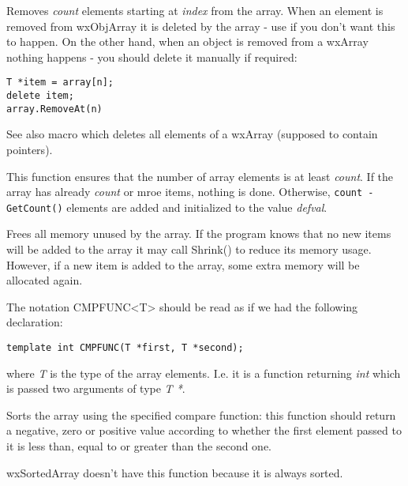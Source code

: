 
Removes {\it count} elements starting at {\it index} from the array. When an
element is removed from wxObjArray it is deleted by the array - use
 if you don't want this to happen. On
the other hand, when an object is removed from a wxArray nothing happens -
you should delete it manually if required:

\begin{verbatim}
T *item = array[n];
delete item;
array.RemoveAt(n)
\end{verbatim}

See also  macro which deletes all
elements of a wxArray (supposed to contain pointers).

\label{wxarraysetcount}


This function ensures that the number of array elements is at least 
{\it count}. If the array has already {\it count} or mroe items, nothing is
done. Otherwise, {\tt count - GetCount()} elements are added and initialized to
the value {\it defval}.



\label{wxarrayshrink}


Frees all memory unused by the array. If the program knows that no new items
will be added to the array it may call Shrink() to reduce its memory usage.
However, if a new item is added to the array, some extra memory will be
allocated again.

\label{wxarraysort}


The notation CMPFUNC<T> should be read as if we had the following declaration:

\begin{verbatim}
template int CMPFUNC(T *first, T *second);
\end{verbatim}

where {\it T} is the type of the array elements. I.e. it is a function returning 
{\it int} which is passed two arguments of type {\it T *}.

Sorts the array using the specified compare function: this function should
return a negative, zero or positive value according to whether the first element
passed to it is less than, equal to or greater than the second one.

wxSortedArray doesn't have this function because it is always sorted.

